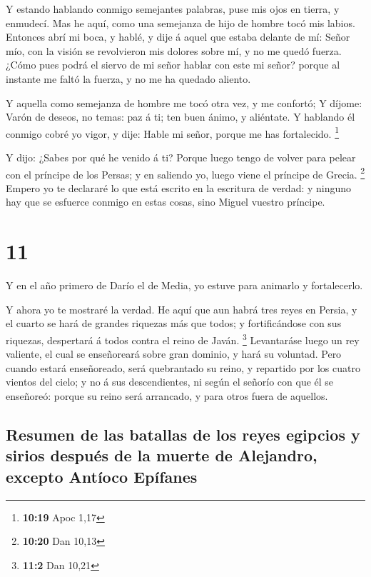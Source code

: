  Y estando hablando conmigo semejantes palabras, puse mis
ojos en tierra, y enmudecí.  Mas he aquí, como una
semejanza de hijo de hombre tocó mis labios. Entonces abrí mi boca, y
hablé, y dije á aquel que estaba delante de mí: Señor mío, con la visión
se revolvieron mis dolores sobre mí, y no me quedó fuerza.
 ¿Cómo pues podrá el siervo de mi señor hablar con este
mi señor? porque al instante me faltó la fuerza, y no me ha quedado
aliento.

 Y aquella como semejanza de hombre me tocó otra vez, y
me confortó;  Y díjome: Varón de deseos, no temas: paz á
ti; ten buen ánimo, y aliéntate. Y hablando él conmigo cobré yo vigor, y
dije: Hable mi señor, porque me has fortalecido. \footnote{\textbf{10:19}
  Apoc 1,17}

 Y dijo: ¿Sabes por qué he venido á ti? Porque luego
tengo de volver para pelear con el príncipe de los Persas; y en saliendo
yo, luego viene el príncipe de Grecia. \footnote{\textbf{10:20} Dan
  10,13}  Empero yo te declararé lo que está escrito en
la escritura de verdad: y ninguno hay que se esfuerce conmigo en estas
cosas, sino Miguel vuestro príncipe.

\hypertarget{section-10}{%
\section{11}\label{section-10}}

 Y en el año primero de Darío el de Media, yo estuve para
animarlo y fortalecerlo.

 Y ahora yo te mostraré la verdad. He aquí que aun habrá
tres reyes en Persia, y el cuarto se hará de grandes riquezas más que
todos; y fortificándose con sus riquezas, despertará á todos contra el
reino de Javán. \footnote{\textbf{11:2} Dan 10,21} 
Levantaráse luego un rey valiente, el cual se enseñoreará sobre gran
dominio, y hará su voluntad.  Pero cuando estará
enseñoreado, será quebrantado su reino, y repartido por los cuatro
vientos del cielo; y no á sus descendientes, ni según el señorío con que
él se enseñoreó: porque su reino será arrancado, y para otros fuera de
aquellos.

\hypertarget{resumen-de-las-batallas-de-los-reyes-egipcios-y-sirios-despuuxe9s-de-la-muerte-de-alejandro-excepto-antuxedoco-epuxedfanes}{%
\subsection{Resumen de las batallas de los reyes egipcios y sirios
después de la muerte de Alejandro, excepto Antíoco
Epífanes}\label{resumen-de-las-batallas-de-los-reyes-egipcios-y-sirios-despuuxe9s-de-la-muerte-de-alejandro-excepto-antuxedoco-epuxedfanes}}

